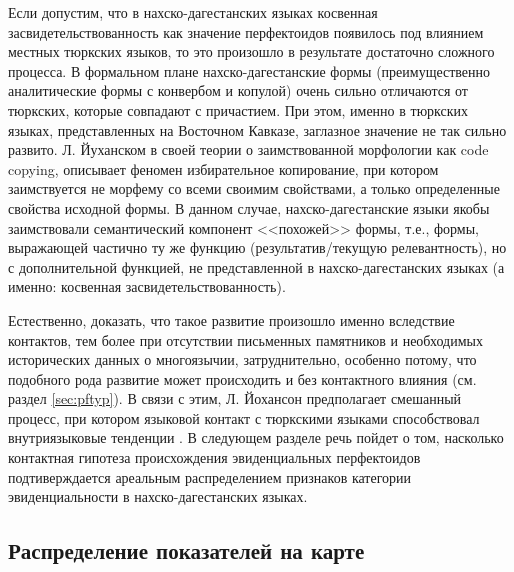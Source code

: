 \par Если допустим, что в нахско-дагестанских языках косвенная засвидетельствованность как значение перфектоидов появилось под влиянием местных тюркских языков, то это произошло в результате достаточно сложного процесса. В формальном плане нахско-дагестанские формы (преимущественно аналитические формы с конвербом и копулой) очень сильно отличаются от тюркских, которые совпадают с причастием. При этом, именно в тюркских языках, представленных на Восточном Кавказе, заглазное значение не так сильно развито. Л. Йуханском в своей теории о заимствованной морфологии как code copying, описывает феномен избирательное копирование, при котором заимствуется не морфему со всеми своимим свойствами, а только определенные свойства исходной формы. В данном случае, нахско-дагестанские языки якобы заимствовали семантический компонент <<похожей>> формы, т.е., формы, выражающей частично ту же функцию (результатив/текущую релевантность), но с дополнительной функцией, не представленной в нахско-дагестанских языках (а именно: косвенная засвидетельствованность).
\par Естественно, доказать, что такое развитие произошло именно вследствие контактов, тем более при отсутствии письменных памятников и необходимых исторических данных о многоязычии, затруднительно, особенно потому, что подобного рода развитие может происходить и без контактного влияния (см. раздел \ref{sec:pftyp}). В связи с этим, Л. Йохансон предполагает смешанный процесс, при котором языковой контакт с тюркскими языками способствовал внутриязыковые тенденции \citep[172]{johanson2006}. В следующем разделе речь пойдет о том, насколько контактная гипотеза происхождения эвиденциальных перфектоидов подтиверждается ареальным распределением признаков категории эвиденциальности в нахско-дагестанских языках.

\subsection{Распределение показателей на карте} \label{sec:maps}

